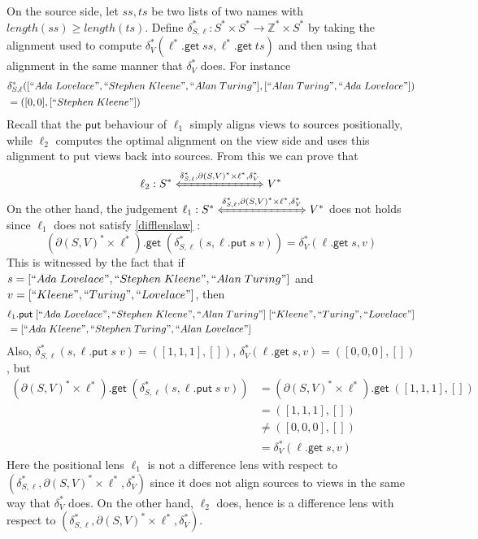 \documentclass[acmsmall,review,anonymous]{acmart}\settopmatter{printfolios=true,printccs=false,printacmref=false}
\theoremstyle{definition}
\newcommand{\kw}[1]{\ensuremath{\mathsf{#1}}\xspace}
\newcommand{\get}{\ensuremath{\kw{get}}\xspace}
\newcommand{\pput}{\ensuremath{\kw{put}}\xspace}
\begin{document}
On the source side, let $ss, ts$ be two lists of two names with $length(ss) \geq length(ts)$.
Define $\delta_{S, \ell}^* : S^* \times S^* \longrightarrow \mathbb{Z}^* \times S^*$ by taking the 
alignment used to compute $\delta_V^*(\ell^*.\get \; ss, \ell^*.\get \; ts)$ and then using that
alignment in the same manner that $\delta_V^*$ does. For instance
\begin{align*}
&\delta_{S, \ell}^*([``Ada \; Lovelace", ``Stephen \; Kleene", ``Alan \; Turing"], 
[``Alan \; Turing", ``Ada \; Lovelace"])\\
&= ([0,0], [``Stephen \; Kleene"])
\end{align*}
Recall that the \pput behaviour of $\ell_1$ simply aligns views to sources
positionally, while $\ell_2$ computes the optimal alignment on the view side and
uses this alignment to put views back into sources. From this we can prove that
$$\ell_2 : S^* \xLeftrightarrow{\delta_{S, \ell}^*, \partial(S, V)^* \times \ell^*, \delta_V^*} V^*$$
On the other hand, the judgement $\ell_1 : S^* \xLeftrightarrow{\delta_{S, \ell}^*, 
\partial(S, V)^* \times \ell^*, \delta_V^*} V^*$ does not holds since $\ell_1$ does not satisfy \cref{difflenslaw} :
$$(\partial(S, V)^* \times \ell^*).\get \; (\delta_{S, \ell}^*(s, \ell.\pput \; s \; v)) = \delta_V^*(\ell.\get
\; s, v)
$$
This is witnessed by the fact that if $s = [``Ada \; Lovelace", ``Stephen \; Kleene", ``Alan \; Turing"]$ and \\
$v = [``Kleene", ``Turing", ``Lovelace"]$, then 
\begin{align*}
&\ell_1.\pput \; [``Ada \; Lovelace", ``Stephen \; Kleene", ``Alan \; Turing"] \; [``Kleene", ``Turing", ``Lovelace"]\\
&= [``Ada \; Kleene", ``Stephen \; Turing", ``Alan \; Lovelace"]
\end{align*}
Also, $\delta_{S, \ell}^*(s, \ell.\pput \; s \; v) = ([1,1,1], [])$, $\delta_V^*(\ell.\get
\; s, v) = ([0,0,0], [])$, but
\begin{align*}
(\partial(S, V)^* \times \ell^*).\get \; (\delta_{S, \ell}^*(s, \ell.\pput \; s \; v)) &=
(\partial(S, V)^* \times \ell^*).\get \; ([1,1,1], [])\\
&= ([1,1,1], [])\\
&\neq ([0,0,0], [])\\
&= \delta_V^*(\ell.\get \; s, v)
\end{align*}
Here the positional lens $\ell_1$ is not a difference lens with respect to $(\delta_{S, \ell}^*, 
\partial(S, V)^* \times \ell^*, \delta_V^*)$ since it does not align sources to views in the same way that
$\delta_V^*$ does. On the other hand, $\ell_2$ does, hence is a difference lens with respect to $(\delta_{S, \ell}^*, 
\partial(S, V)^* \times \ell^*, \delta_V^*)$. 
\end{document}

